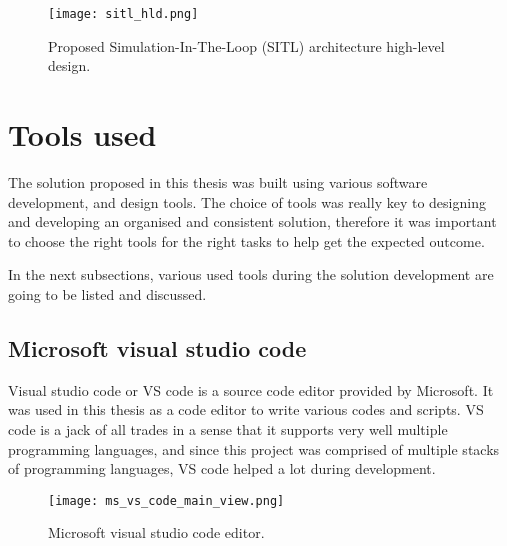 \begin{figure}[H]
    \centering \texttt{[image: sitl\_hld.png]}
    \caption{Proposed Simulation-In-The-Loop (SITL) architecture high-level design.}
    \label{fig:sitl-hld}
\end{figure}




\section{Tools used}
\label{sec:tools-used}

The solution proposed in this thesis was built using various software development, and design tools. The choice of tools was really key to designing and developing an organised and consistent solution, therefore it was important to choose the right tools for the right tasks to help get the expected outcome.

In the next subsections, various used tools during the solution development are going to be listed and discussed.



\subsection{Microsoft visual studio code}
\label{subsec:ms-visual-studio-code}

Visual studio code or VS code is a source code editor provided by Microsoft. It was used in this thesis as a code editor to write various codes and scripts. VS code is a jack of all trades in a sense that it supports very well multiple programming languages, and since this project was comprised of multiple stacks of programming languages, VS code helped a lot during development.

\begin{figure}[H]
    \centering \texttt{[image: ms\_vs\_code\_main\_view.png]}
    \caption{Microsoft visual studio code editor.}
    \label{fig:ms-vs-code}
\end{figure}



